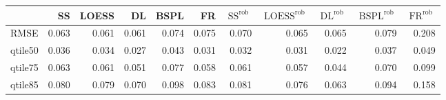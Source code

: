 \begin{tabular}{lrrrrrrrrrr}
\toprule
 & SS & LOESS & DL & BSPL & FR & $\operatorname{SS}^{\text{rob}}$ & $\operatorname{LOESS}^{\text{rob}}$ & $\operatorname{DL}^{\text{rob}}$ & $\operatorname{BSPL}^{\text{rob}}$ & $\operatorname{FR}^{\text{rob}}$ \\
\midrule
RMSE & {\cellcolor[HTML]{EEEEEE}} \color[HTML]{000000} 0.063 & {\cellcolor[HTML]{F1F1F1}} \color[HTML]{000000} 0.061 & {\cellcolor[HTML]{F1F1F1}} \color[HTML]{000000} 0.061 & {\cellcolor[HTML]{DCDCDC}} \color[HTML]{000000} 0.074 & {\cellcolor[HTML]{DADADA}} \color[HTML]{000000} 0.075 & {\cellcolor[HTML]{E2E2E2}} \color[HTML]{000000} 0.070 & {\cellcolor[HTML]{EBEBEB}} \color[HTML]{000000} 0.065 & {\cellcolor[HTML]{EBEBEB}} \color[HTML]{000000} 0.065 & {\cellcolor[HTML]{D3D3D3}} \color[HTML]{000000} 0.079 & {\cellcolor[HTML]{000000}} \color[HTML]{F1F1F1} 0.208 \\
qtile50 & {\cellcolor[HTML]{747474}} \color[HTML]{F1F1F1} 0.036 & {\cellcolor[HTML]{868686}} \color[HTML]{F1F1F1} 0.034 & {\cellcolor[HTML]{C4C4C4}} \color[HTML]{000000} 0.027 & {\cellcolor[HTML]{353535}} \color[HTML]{F1F1F1} 0.043 & {\cellcolor[HTML]{A0A0A0}} \color[HTML]{F1F1F1} 0.031 & {\cellcolor[HTML]{989898}} \color[HTML]{F1F1F1} 0.032 & {\cellcolor[HTML]{A0A0A0}} \color[HTML]{F1F1F1} 0.031 & {\cellcolor[HTML]{F1F1F1}} \color[HTML]{000000} 0.022 & {\cellcolor[HTML]{6B6B6B}} \color[HTML]{F1F1F1} 0.037 & {\cellcolor[HTML]{000000}} \color[HTML]{F1F1F1} 0.049 \\
qtile75 & {\cellcolor[HTML]{9E9E9E}} \color[HTML]{F1F1F1} 0.063 & {\cellcolor[HTML]{A6A6A6}} \color[HTML]{F1F1F1} 0.061 & {\cellcolor[HTML]{D2D2D2}} \color[HTML]{000000} 0.051 & {\cellcolor[HTML]{606060}} \color[HTML]{F1F1F1} 0.077 & {\cellcolor[HTML]{B3B3B3}} \color[HTML]{000000} 0.058 & {\cellcolor[HTML]{A6A6A6}} \color[HTML]{F1F1F1} 0.061 & {\cellcolor[HTML]{B8B8B8}} \color[HTML]{000000} 0.057 & {\cellcolor[HTML]{F1F1F1}} \color[HTML]{000000} 0.044 & {\cellcolor[HTML]{7E7E7E}} \color[HTML]{F1F1F1} 0.070 & {\cellcolor[HTML]{000000}} \color[HTML]{F1F1F1} 0.099 \\
qtile85 & {\cellcolor[HTML]{C6C6C6}} \color[HTML]{000000} 0.080 & {\cellcolor[HTML]{C8C8C8}} \color[HTML]{000000} 0.079 & {\cellcolor[HTML]{E0E0E0}} \color[HTML]{000000} 0.070 & {\cellcolor[HTML]{989898}} \color[HTML]{F1F1F1} 0.098 & {\cellcolor[HTML]{BFBFBF}} \color[HTML]{000000} 0.083 & {\cellcolor[HTML]{C3C3C3}} \color[HTML]{000000} 0.081 & {\cellcolor[HTML]{D0D0D0}} \color[HTML]{000000} 0.076 & {\cellcolor[HTML]{F1F1F1}} \color[HTML]{000000} 0.063 & {\cellcolor[HTML]{A2A2A2}} \color[HTML]{F1F1F1} 0.094 & {\cellcolor[HTML]{000000}} \color[HTML]{F1F1F1} 0.158 \\

\end{tabular}
